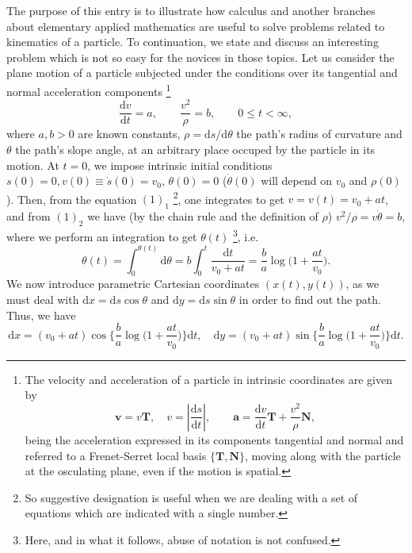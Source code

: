 \documentclass[12pt]{article}
\newcommand{\ud}{\mathrm{d}}
\begin{document}
The purpose of this entry is to illustrate how calculus and another branches about elementary applied mathematics are useful to solve problems related to kinematics of a particle. To continuation, we state and discuss an interesting problem which is not so easy for the novices in those topics. Let us consider the plane motion of a particle subjected under the conditions over its tangential and normal acceleration components {\footnote{The velocity and acceleration of a particle in intrinsic coordinates are given by
\begin{equation*}
\mathbf{v}=v\mathbf{T}, \quad v=\left | \frac{\ud s}{\ud t}\right |, \qquad 
\mathbf{a}=\frac{\ud v}{\ud t}\mathbf{T}+\frac{v^2}{\rho}\mathbf{N},
\end{equation*}
being the acceleration expressed in its components tangential and normal and referred to a Frenet-Serret local basis $\{\mathbf{T},\mathbf{N}\}$, moving along with the particle at the osculating plane, even if the motion is spatial.}} 
\begin{equation}
\frac{\ud v}{\ud t}=a, \qquad \frac{v^2}{\rho}=b, \qquad 0\leq t<\infty,
\end{equation}
where $a,b>0$ are known constants, $\rho=\ud s/\ud \theta$ the path's radius of curvature and $\theta$ the path's slope angle, at an arbitrary place occuped by the particle in its motion. At $t=0$, we impose intrinsic initial conditions $s(0)=0, v(0)\equiv\dot{s}(0)=v_0$, $\theta(0)=0$ ($\dot{\theta}(0)$ will depend on $v_0$ and $\rho(0)$). Then, from the equation $(1)_1$ {\footnote{So suggestive designation is useful when we are dealing with a set of equations which are indicated with a single number.}}, one integrates to get $v=v(t)=v_0+at$, and from $(1)_2$ we have (by the chain rule and the definition of $\rho$) $v^2/\rho=v\dot{\theta}=b$, where we perform an integration to get $\theta(t)$ {\footnote{Here, and in what it follows, abuse of notation is not confused.}}, i.e.
\begin{equation}
\theta(t)=\int_0^{\theta(t)}\!\!\ud\theta=b\int_0^t\frac{\ud t}{v_0+at}=\frac{b}{a}\log\bigg(1+\frac{at}{v_0}\bigg).
\end{equation}
We now introduce parametric Cartesian coordinates $(x(t),y(t))$, as we must deal with $\ud x=\ud s\cos\theta$ and 
$\ud y=\ud s \sin\theta$ in order to find out the path. Thus, we have
\begin{equation}
\ud x=(v_0+at)\cos\bigg\{\frac{b}{a}\log\bigg(1+\frac{at}{v_0}\bigg)\bigg\}\ud t, \quad
\ud y=(v_0+at)\sin\bigg\{\frac{b}{a}\log\bigg(1+\frac{at}{v_0}\bigg)\bigg\}\ud t.
\end{equation} 
\end{document}
